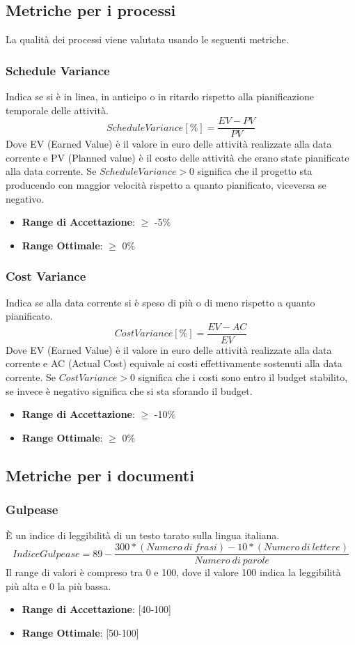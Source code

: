 \documentclass[12pt,a4paper]{article}
\begin{document}
\subsection{Metriche per i processi}\label{metriche_processi}
La qualità dei processi viene valutata usando le seguenti metriche.
\subsubsection{Schedule Variance}
Indica se si è in linea, in anticipo o in ritardo rispetto alla pianificazione temporale delle attività.
\[ScheduleVariance [\%] = \frac{EV - PV}{PV}\]
Dove EV (Earned Value) è il valore in euro delle attività realizzate alla data corrente e PV (Planned value) è il costo delle attività che erano state pianificate alla data corrente.
Se $ScheduleVariance > 0$ significa che il progetto sta producendo con maggior velocità rispetto a quanto pianificato, viceversa se negativo.
\begin{itemize}
\item \textbf{Range di Accettazione}: $\geq$ -5\%
\item \textbf{Range Ottimale}: $\geq$ 0\%
\end{itemize}
\subsubsection{Cost Variance}
Indica se alla data corrente si è speso di più o di meno rispetto a quanto pianificato.
\[CostVariance [\%] = \frac{EV - AC}{EV}\]
Dove EV (Earned Value) è il valore in euro delle attività realizzate alla data corrente e AC (Actual Cost) equivale ai costi effettivamente sostenuti alla data corrente.
Se $CostVariance > 0$ significa che i costi sono entro il budget stabilito, se invece è negativo significa che si sta sforando il budget.
\begin{itemize}
\item \textbf{Range di Accettazione}: $\geq$ -10\%
\item \textbf{Range Ottimale}: $\geq$ 0\%
\end{itemize}
\subsection{Metriche per i documenti}\label{metriche_doc}
\subsubsection{Gulpease}
È un indice di leggibilità di un testo tarato sulla lingua italiana.
\[IndiceGulpease=89-\frac{300*(Numero\ di\ frasi)-10*(Numero\ di\ lettere)}{Numero\ di\ parole}\]
Il range di valori è compreso tra 0 e 100, dove il valore 100 indica la leggibilità più alta e 0 la più bassa.
\begin{itemize}
\item \textbf{Range di Accettazione}: [40-100]
\item \textbf{Range Ottimale}: [50-100]
\end{itemize}
\end{document}
